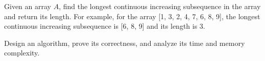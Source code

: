\problem{}
Given an array $A$, find the longest continuous increasing subsequence in the array and return its length. For example, for the array [1, 3, 2, 4, 7, 6, 8, 9], the longest continuous increasing subsequence is [6, 8, 9] and its length is 3. 

\noindent Design an algorithm, prove its correctness, and analyze its time and memory complexity.

\solution{

}
 
\newpage